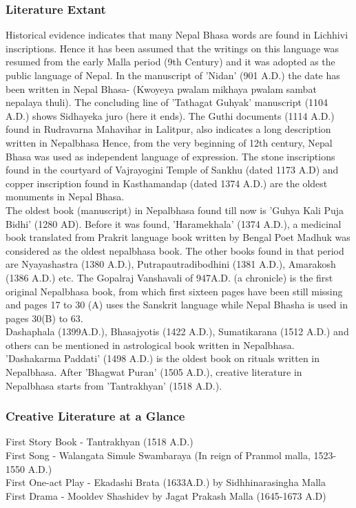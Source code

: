 \documentclass[a4paper,13pt, margin=0.9in]{article}
\begin{document}
\begin{flushleft}
\subsubsection{Literature Extant}
Historical evidence indicates that many Nepal Bhasa words are found in Lichhivi inscriptions. Hence it has been assumed that the writings on this language was resumed from the early Malla period (9th Century) and it was adopted as the public language of Nepal. In the manuscript of 'Nidan' (901 A.D.) the date has been written in Nepal Bhasa- (Kwoyeya pwalam mikhaya pwalam sambat nepalaya thuli). The concluding line of 'Tathagat Guhyak' manuscript (1104 A.D.) shows Sidhayeka juro (here it ends). The Guthi documents (1114 A.D.) found in Rudravarna Mahavihar in Lalitpur, also indicates a long description written in Nepalbhasa Hence, from the very beginning of 12th century, Nepal Bhasa was used as independent language of expression. The stone inscriptions found in the courtyard of Vajrayogini Temple of Sankhu (dated 1173 A.D) and copper inscription found in Kasthamandap (dated 1374 A.D.) are the oldest monuments in Nepal Bhasa. \\

The oldest book (manuscript) in Nepalbhasa found till now is 'Guhya Kali Puja Bidhi' (1280 AD). Before it was found, 'Haramekhala' (1374 A.D.), a medicinal book translated from Prakrit language book written by Bengal Poet Madhuk was considered as the oldest nepalbhasa book. The other books found in that period are Nyayashastra (1380 A.D.), Putrapautradibodhini (1381 A.D.), Amarakosh (1386 A.D.) etc. The Gopalraj Vanshavali of 947A.D. (a chronicle) is the first original Nepalbhasa book, from which first sixteen pages have been still missing and pages 17 to 30 (A) uses the Sanskrit language while Nepal Bhasha is used in pages 30(B) to 63. \\

Dashaphala (1399A.D.), Bhasajyotis (1422 A.D.), Sumatikarana (1512 A.D.) and others can be mentioned in astrological book written in Nepalbhasa. 'Dashakarma Paddati' (1498 A.D.) is the oldest book on rituals written in Nepalbhasa. After 'Bhagwat Puran' (1505 A.D.), creative literature in Nepalbhasa starts from 'Tantrakhyan' (1518 A.D.).\\

\subsubsection{Creative Literature at a Glance}
First Story Book - Tantrakhyan (1518 A.D.)\\
First Song - Walangata Simule Swambaraya (In reign of Pranmol malla, 1523-1550 A.D.)\\
First One-act Play - Ekadashi Brata (1633A.D.) by Sidhhinarasingha Malla\\
First Drama - Mooldev Shashidev by Jagat Prakash Malla (1645-1673 A.D)\\



\end{flushleft}
\end{document}
